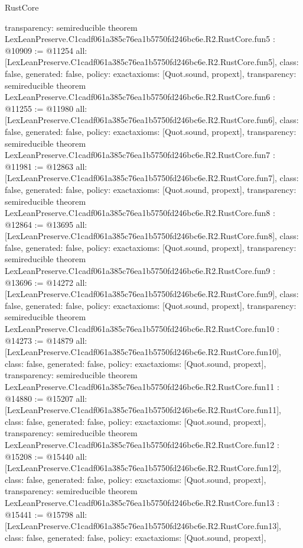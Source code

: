 \begin{lexlean}{RustCore}
\begin{coremodule}
{  transparency: semireducible
}
theorem LexLeanPreserve.C1cadf061a385c76ea1b5750fd246bc6e.R2.RustCore.fun5 : @10909 := @11254 {
  all: [LexLeanPreserve.C1cadf061a385c76ea1b5750fd246bc6e.R2.RustCore.fun5],
  class: false,
  generated: false,
  policy: exact{axioms: [Quot.sound, propext]},
  transparency: semireducible
}
theorem LexLeanPreserve.C1cadf061a385c76ea1b5750fd246bc6e.R2.RustCore.fun6 : @11255 := @11980 {
  all: [LexLeanPreserve.C1cadf061a385c76ea1b5750fd246bc6e.R2.RustCore.fun6],
  class: false,
  generated: false,
  policy: exact{axioms: [Quot.sound, propext]},
  transparency: semireducible
}
theorem LexLeanPreserve.C1cadf061a385c76ea1b5750fd246bc6e.R2.RustCore.fun7 : @11981 := @12863 {
  all: [LexLeanPreserve.C1cadf061a385c76ea1b5750fd246bc6e.R2.RustCore.fun7],
  class: false,
  generated: false,
  policy: exact{axioms: [Quot.sound, propext]},
  transparency: semireducible
}
theorem LexLeanPreserve.C1cadf061a385c76ea1b5750fd246bc6e.R2.RustCore.fun8 : @12864 := @13695 {
  all: [LexLeanPreserve.C1cadf061a385c76ea1b5750fd246bc6e.R2.RustCore.fun8],
  class: false,
  generated: false,
  policy: exact{axioms: [Quot.sound, propext]},
  transparency: semireducible
}
theorem LexLeanPreserve.C1cadf061a385c76ea1b5750fd246bc6e.R2.RustCore.fun9 : @13696 := @14272 {
  all: [LexLeanPreserve.C1cadf061a385c76ea1b5750fd246bc6e.R2.RustCore.fun9],
  class: false,
  generated: false,
  policy: exact{axioms: [Quot.sound, propext]},
  transparency: semireducible
}
theorem LexLeanPreserve.C1cadf061a385c76ea1b5750fd246bc6e.R2.RustCore.fun10 : @14273 := @14879 {
  all: [LexLeanPreserve.C1cadf061a385c76ea1b5750fd246bc6e.R2.RustCore.fun10],
  class: false,
  generated: false,
  policy: exact{axioms: [Quot.sound, propext]},
  transparency: semireducible
}
theorem LexLeanPreserve.C1cadf061a385c76ea1b5750fd246bc6e.R2.RustCore.fun11 : @14880 := @15207 {
  all: [LexLeanPreserve.C1cadf061a385c76ea1b5750fd246bc6e.R2.RustCore.fun11],
  class: false,
  generated: false,
  policy: exact{axioms: [Quot.sound, propext]},
  transparency: semireducible
}
theorem LexLeanPreserve.C1cadf061a385c76ea1b5750fd246bc6e.R2.RustCore.fun12 : @15208 := @15440 {
  all: [LexLeanPreserve.C1cadf061a385c76ea1b5750fd246bc6e.R2.RustCore.fun12],
  class: false,
  generated: false,
  policy: exact{axioms: [Quot.sound, propext]},
  transparency: semireducible
}
theorem LexLeanPreserve.C1cadf061a385c76ea1b5750fd246bc6e.R2.RustCore.fun13 : @15441 := @15798 {
  all: [LexLeanPreserve.C1cadf061a385c76ea1b5750fd246bc6e.R2.RustCore.fun13],
  class: false,
  generated: false,
  policy: exact{axioms: [Quot.sound, propext]},
}
\end{coremodule}
\end{lexlean}
